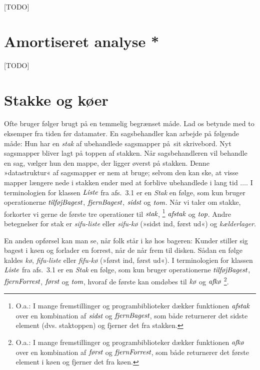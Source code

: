 [TODO]


\section{Amortiseret analyse *}

[TODO]

\section{Stakke og køer}

Ofte bruger følger brugt på en temmelig begrænset måde.
Lad os betynde med to eksemper fra tiden før datamater.
En sagsbehandler kan arbejde på følgende måde:
Hun har en \emph{stak} af ubehandlede sagsmapper på sit skrivebord.
Nyt sagsmapper bliver lagt på toppen af stakken.
Når sagsbehandleren vil behandle en sag, vælger hun den mappe, der ligger øverst på stakken.
Denne »datastruktur« af sagsmapper er nem at bruge; selvom den kan ske, at visse mapper længere nede i stakken ender med at forblive ubehandlede i lang tid $\ldots$.
I terminologien for klassen $\operatorname{\emph{Liste}}$ fra afs.~3.1 er en \emph{Stak} en følge, som kun bruger operationerne $\operatorname{\emph{tilføjBagest}}$, $\operatorname{\emph{fjernBagest}}$, $\operatorname{\emph{sidst}}$ og $\operatorname{\emph{tom}}$.
Når vi taler om stakke, forkorter vi gerne de første tre operationer til $\operatorname{\emph{stak}}$,
\footnote{O.a.: I mange fremstillinger og programbiblioteker dækker funktionen $\operatorname{\emph{afstak}}$ over en kombination af $\operatorname{\emph{sidst}}$ og $\operatorname{\emph{fjernBagest}}$, som både returnerer det sidste element (dvs. staktoppen) og fjerner det fra stakken.}
$\operatorname{\emph{afstak}}$ og $\operatorname{\emph{top}}$.
Andre betegnelser for stak er \emph{sifu-liste} eller \emph{sifu-kø} (»sidst ind, først ud«) og \emph{kælderlager}.

En anden opførsel kan man se, når folk står i kø hos bageren:
Kunder stiller sig bagest i køen og forlader en forrest, når de når frem til disken.
Sådan en følge kaldes \emph{kø}, \emph{fifu-liste} eller \emph{fifu-kø} (»først ind, først ud«).
I terminologien for klassen $\operatorname{\emph{Liste}}$ fra afs.~3.1 er en \emph{Stak} en følge, som kun bruger operationerne $\operatorname{\emph{tilføjBagest}}$, $\operatorname{\emph{fjernForrest}}$, $\operatorname{\emph{først}}$ og $\operatorname{\emph{tom}}$, hvoraf de første kan omdøbes til $\operatorname{\emph{kø}}$ og $\operatorname{\emph{afkø}}$%
\footnote{O.a.: I mange fremstillinger og programbiblioteker dækker funktionen $\operatorname{\emph{afkø}}$ over en kombination af $\operatorname{\emph{først}}$ og $\operatorname{\emph{fjernForrest}}$, som både returnerer det første element i køen og fjerner det fra køen.}.

